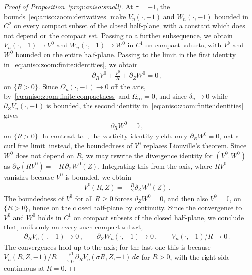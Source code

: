 \documentclass[11pt,reqno]{amsproc}
\numberwithin{equation}{section}
\theoremstyle{remark}
\newcommand{\p}{\partial}
\begin{document}
\begin{proof}[Proof of Proposition~\ref{prop:aniso:small}]
At $\tau=-1$, the bounds~\eqref{eq:aniso:zoom:derivatives} make $V_n(\cdot,-1)$ and $W_n(\cdot,-1)$ bounded in $C^2$ on every compact subset of the closed half-plane, with a constant which does not depend on the compact set. Passing to a further subsequence, we obtain $V_n(\cdot,-1)\to V^0$ and $W_n(\cdot,-1)\to W^0$ in $C^1$ on compact subsets, with $V^0$ and $W^0$ bounded on the entire half-plane. Passing to the limit in the first identity in~\eqref{eq:aniso:zoom:finite:identities}, we obtain
\begin{align*}
\p_R V^0+\frac{V^0}{R}+\p_Z W^0=0
\,,
\end{align*}
on $\{R>0\}$. Since $\Omega_n(\cdot,-1)\to0$ off the axis, by~\eqref{eq:aniso:zoom:finite:compactness} and $\Omega_\infty=0$, and since $\delta_n\to0$ while $\p_ZV_n(\cdot,-1)$ is bounded, the second identity in~\eqref{eq:aniso:zoom:finite:identities} gives
\begin{align*}
\p_RW^0=0
\,,
\end{align*}
on $\{R>0\}$.
In contrast to~\cite{CIVEulerLength}, the vorticity identity yields only $\p_RW^0=0$, not a curl free limit; instead, the boundedness of $V^0$ replaces Liouville's theorem.
Since $W^0$ does not depend on $R$, we may rewrite the divergence identity for $(V^0,W^0)$ as $\p_R(RV^0)=-R\,\p_ZW^0(Z)$. Integrating this from the axis, where $RV^0$ vanishes because $V^0$ is bounded, we obtain
\begin{align*}
V^0(R,Z)=-\frac R2\p_ZW^0(Z)
\,.
\end{align*}
The boundedness of $V^0$ for all $R\ge0$ forces $\p_ZW^0=0$, and then also $V^0=0$, on $\{R>0\}$, hence on the closed half-plane by continuity. Since the convergence to $V^0$ and $W^0$ holds in $C^1$ on compact subsets of the closed half-plane, we conclude that, uniformly on every such compact subset,
\begin{align}
\p_RV_n(\cdot,-1)\to 0
\,,\qquad
\p_ZW_n(\cdot,-1)\to 0
\,,\qquad
V_n(\cdot,-1)/R\to 0
\,.
\label{eq:aniso:zoom:finite:endpoint}
\end{align}
The convergences hold up to the axis; for the last one this is because $V_n(R,Z,-1)/R=\int_0^1\p_RV_n(\sigma R,Z,-1)\,d\sigma$ for $R>0$, with the right side continuous at $R=0$.


\end{proof}
\end{document}

